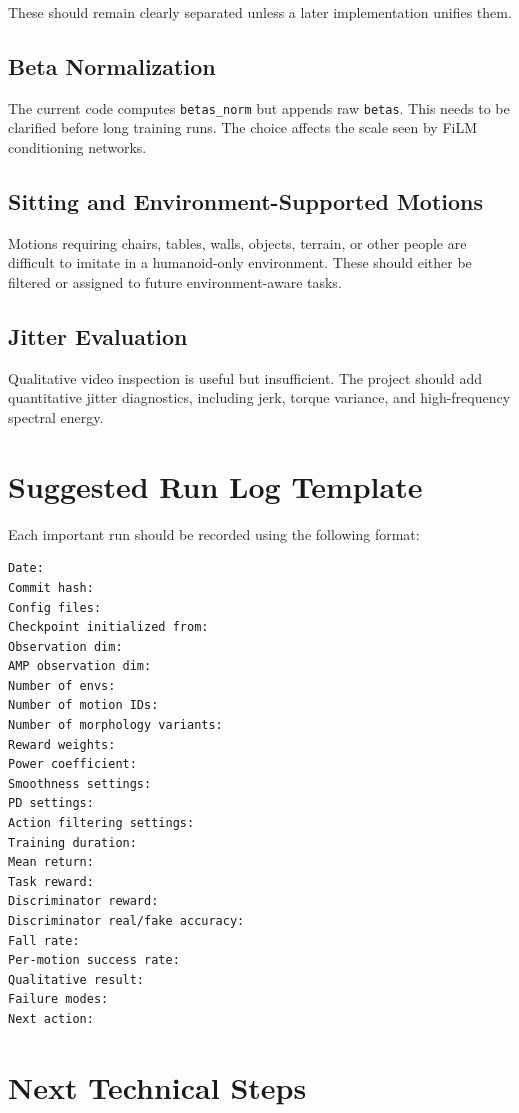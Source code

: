 \documentclass[11pt,a4paper]{article}
\begin{document}
These should remain clearly separated unless a later implementation unifies them.

\subsection{Beta Normalization}

The current code computes \texttt{betas\_norm} but appends raw \texttt{betas}. This needs to be clarified before long training runs. The choice affects the scale seen by FiLM conditioning networks.

\subsection{Sitting and Environment-Supported Motions}

Motions requiring chairs, tables, walls, objects, terrain, or other people are difficult to imitate in a humanoid-only environment. These should either be filtered or assigned to future environment-aware tasks.

\subsection{Jitter Evaluation}

Qualitative video inspection is useful but insufficient. The project should add quantitative jitter diagnostics, including jerk, torque variance, and high-frequency spectral energy.

\section{Suggested Run Log Template}

Each important run should be recorded using the following format:

\begin{lstlisting}
Date:
Commit hash:
Config files:
Checkpoint initialized from:
Observation dim:
AMP observation dim:
Number of envs:
Number of motion IDs:
Number of morphology variants:
Reward weights:
Power coefficient:
Smoothness settings:
PD settings:
Action filtering settings:
Training duration:
Mean return:
Task reward:
Discriminator reward:
Discriminator real/fake accuracy:
Fall rate:
Per-motion success rate:
Qualitative result:
Failure modes:
Next action:
\end{lstlisting}

\section{Next Technical Steps}
\end{document}
